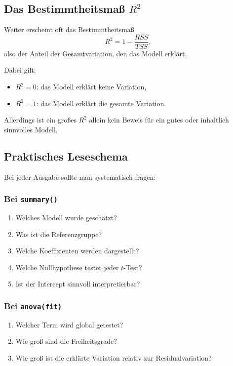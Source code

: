 \documentclass[10pt, letterpaper]{article}
\begin{document}
\subsection{Das Bestimmtheitsmaß \(R^2\)}

Weiter erscheint oft das Bestimmtheitsmaß
\[
R^2=1-\frac{RSS}{TSS},
\]
also der Anteil der Gesamtvariation, den das Modell erklärt.

Dabei gilt:
\begin{itemize}
    \item \(R^2=0\): das Modell erklärt keine Variation,
    \item \(R^2=1\): das Modell erklärt die gesamte Variation.
\end{itemize}
Allerdings ist ein großes \(R^2\) allein kein Beweis für ein gutes oder inhaltlich sinnvolles Modell.

\subsection{Praktisches Leseschema}

Bei jeder Ausgabe sollte man systematisch fragen:

\subsubsection*{Bei \texttt{summary()}}
\begin{enumerate}
    \item Welches Modell wurde geschätzt?
    \item Was ist die Referenzgruppe?
    \item Welche Koeffizienten werden dargestellt?
    \item Welche Nullhypothese testet jeder \(t\)-Test?
    \item Ist der Intercept sinnvoll interpretierbar?
\end{enumerate}

\subsubsection*{Bei \texttt{anova(fit)}}
\begin{enumerate}
    \item Welcher Term wird global getestet?
    \item Wie groß sind die Freiheitsgrade?
    \item Wie groß ist die erklärte Variation relativ zur Residualvariation?
\end{enumerate}
\end{document}
